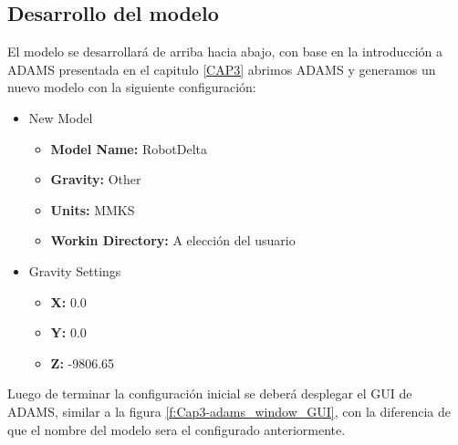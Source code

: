 
    
    \subsection{ Desarrollo del modelo}
    
        El modelo se desarrollará de arriba hacia abajo, con base en la introducción a ADAMS presentada en el capitulo \eqref{CAP3} abrimos ADAMS y generamos un nuevo modelo con la siguiente configuración:

        \begin{scope}
            \renewcommand{\labelitemi}{\blacklozenge}
            \renewcommand{\labelitemii}{\checkmark}
            \begin{itemize}
                \item New Model
                \begin{itemize}
                    \item \textbf{Model Name:} RobotDelta
                    \item \textbf{Gravity:} Other
                    \item \textbf{Units:} MMKS
                    \item \textbf{Workin Directory:} A elección del usuario
                \end{itemize}
            \end{itemize}
            
            \begin{itemize}
                \item Gravity Settings
                \begin{itemize}
                    \item \textbf{X:} 0.0
                    \item \textbf{Y:} 0.0
                    \item \textbf{Z:} -9806.65
                \end{itemize}
            \end{itemize}
        \end{scope}
        
        Luego de terminar la configuración inicial se deberá desplegar el GUI de ADAMS, similar a la figura \eqref{f:Cap3-adams_window_GUI}, con la diferencia de que el nombre del modelo sera el configurado anteriormente.
        
